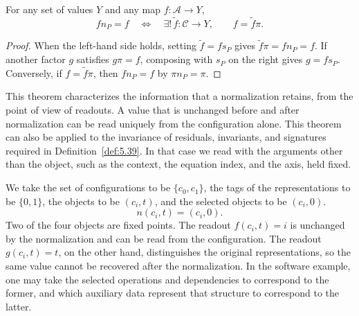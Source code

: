 \begin{theorem}\label{thm:6.3}

For any set of values $Y$ and any map $f:\mathcal{A}\to Y$,
\begin{equation*}
fn_P=f
\quad\Longleftrightarrow\quad
\exists!\,\widetilde f:\mathcal{C}\to Y,
\qquad f=\widetilde f\pi.
\tag{6.4}\label{eq:6.4}
\end{equation*}

\end{theorem}

\begin{proof}

When the left-hand side holds, setting $\widetilde f=fs_P$ gives
$\widetilde f\pi=fn_P=f$.
If another factor $g$ satisfies $g\pi=f$, composing with $s_P$ on the right gives
$g=fs_P$. Conversely, if $f=\widetilde f\pi$, then
$fn_P=f$ by $\pi n_P=\pi$.

\end{proof}

This theorem characterizes the information that a normalization retains, from the point of
view of readouts.
A value that is unchanged before and after normalization can be read uniquely from the
configuration alone.
This theorem can also be applied to the invariance of residuals, invariants, and signatures
required in Definition~\ref{def:5.39}.
In that case we read with the arguments other than the object, such as the context, the
equation index, and the axis, held fixed.

\begin{example}\label{ex:6.4}

We take the set of configurations to be $\{c_0,c_1\}$, the tags of the representations
to be $\{0,1\}$, the objects to be $(c_i,t)$, and the selected objects to be $(c_i,0)$.
\begin{equation*}
n(c_i,t)=(c_i,0).
\tag{6.5}\label{eq:6.5}
\end{equation*}
Two of the four objects are fixed points.
The readout $f(c_i,t)=i$ is unchanged by the normalization and can be read from the
configuration.
The readout $g(c_i,t)=t$, on the other hand, distinguishes the original representations, so
the same value cannot be recovered after the normalization.
In the software example, one may take the selected operations and dependencies to
correspond to the former, and which auxiliary data represent that structure to correspond
to the latter.

\end{example}

